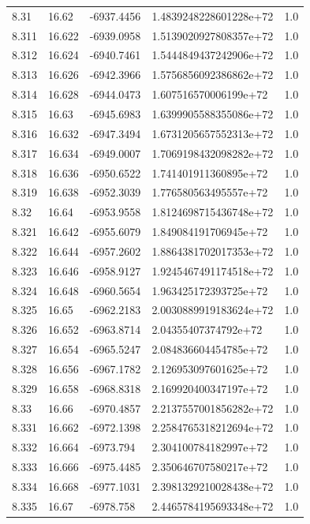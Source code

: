 \begin{tabular}{lllll}
8.31 & 16.62 & -6937.4456 & 1.4839248228601228e+72 & 1.0 \\
8.311 & 16.622 & -6939.0958 & 1.5139020927808357e+72 & 1.0 \\
8.312 & 16.624 & -6940.7461 & 1.5444849437242906e+72 & 1.0 \\
8.313 & 16.626 & -6942.3966 & 1.5756856092386862e+72 & 1.0 \\
8.314 & 16.628 & -6944.0473 & 1.607516570006199e+72 & 1.0 \\
8.315 & 16.63 & -6945.6983 & 1.6399905588355086e+72 & 1.0 \\
8.316 & 16.632 & -6947.3494 & 1.6731205657552313e+72 & 1.0 \\
8.317 & 16.634 & -6949.0007 & 1.7069198432098282e+72 & 1.0 \\
8.318 & 16.636 & -6950.6522 & 1.741401911360895e+72 & 1.0 \\
8.319 & 16.638 & -6952.3039 & 1.776580563495557e+72 & 1.0 \\
8.32 & 16.64 & -6953.9558 & 1.8124698715436748e+72 & 1.0 \\
8.321 & 16.642 & -6955.6079 & 1.849084191706945e+72 & 1.0 \\
8.322 & 16.644 & -6957.2602 & 1.8864381702017353e+72 & 1.0 \\
8.323 & 16.646 & -6958.9127 & 1.9245467491174518e+72 & 1.0 \\
8.324 & 16.648 & -6960.5654 & 1.963425172393725e+72 & 1.0 \\
8.325 & 16.65 & -6962.2183 & 2.0030889919183624e+72 & 1.0 \\
8.326 & 16.652 & -6963.8714 & 2.04355407374792e+72 & 1.0 \\
8.327 & 16.654 & -6965.5247 & 2.084836604454785e+72 & 1.0 \\
8.328 & 16.656 & -6967.1782 & 2.126953097601625e+72 & 1.0 \\
8.329 & 16.658 & -6968.8318 & 2.169920400347197e+72 & 1.0 \\
8.33 & 16.66 & -6970.4857 & 2.2137557001856282e+72 & 1.0 \\
8.331 & 16.662 & -6972.1398 & 2.2584765318212694e+72 & 1.0 \\
8.332 & 16.664 & -6973.794 & 2.304100784182997e+72 & 1.0 \\
8.333 & 16.666 & -6975.4485 & 2.350646707580217e+72 & 1.0 \\
8.334 & 16.668 & -6977.1031 & 2.3981329210028438e+72 & 1.0 \\
8.335 & 16.67 & -6978.758 & 2.4465784195693348e+72 & 1.0 \\

\end{tabular}
